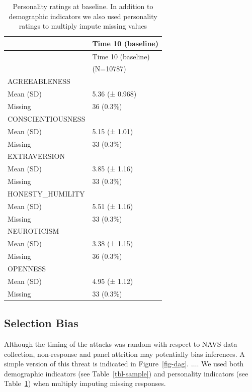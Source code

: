\documentclass[
  singlecolumn]{report}
\begin{document}
\hypertarget{tbl-personality}{}
\begin{longtable}[]{@{}ll@{}}
\caption{\label{tbl-personality}Personality ratings at baseline. In
addition to demographic indicators we also used personality ratings to
multiply impute missing values}\tabularnewline
\toprule()
& Time 10 (baseline) \\
\midrule()
\endfirsthead
\toprule()
& Time 10 (baseline) \\
\midrule()
\endhead
& (N=10787) \\
AGREEABLENESS & \\
Mean (SD) & 5.36 (± 0.968) \\
Missing & 36 (0.3\%) \\
CONSCIENTIOUSNESS & \\
Mean (SD) & 5.15 (± 1.01) \\
Missing & 33 (0.3\%) \\
EXTRAVERSION & \\
Mean (SD) & 3.85 (± 1.16) \\
Missing & 33 (0.3\%) \\
HONESTY\_HUMILITY & \\
Mean (SD) & 5.51 (± 1.16) \\
Missing & 33 (0.3\%) \\
NEUROTICISM & \\
Mean (SD) & 3.38 (± 1.15) \\
Missing & 36 (0.3\%) \\
OPENNESS & \\
Mean (SD) & 4.95 (± 1.12) \\
Missing & 33 (0.3\%) \\
\bottomrule()
\end{longtable}

\hypertarget{selection-bias}{%
\subsection{Selection Bias}\label{selection-bias}}

Although the timing of the attacks was random with respect to NAVS data
collection, non-response and panel attrition may potentially bias
inferences. A simple version of this threat is indicated in
Figure~\ref{fig-dag}. \(\dots\). We used both demographic indicators
(see Table~\ref{tbl-sample}) and personality indicators (see
Table~\ref{tbl-personality}) when multiply imputing missing responses.
\end{document}
